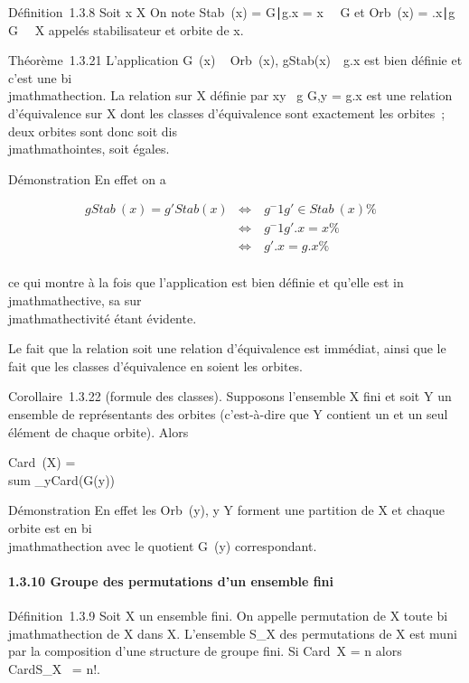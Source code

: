Définition~1.3.8 Soit x \in X On note Stab~(x) =
\g \in G∣g.x =
x\ \subset~ G et Orb~(x) =
\g.x∣g \in G\
\subset~ X appelés stabilisateur et orbite de x.

Théorème~1.3.21 L'application G\diagupStab~(x)
\rightarrow~ Orb~(x),
gStab(x)\mathrel\mapsto~~g.x est
bien définie et c'est une bi\\jmathmathection. La relation sur X définie par xy
\Leftrightarrow \exists~g \in G,y = g.x
est une relation d'équivalence sur X dont les classes d'équivalence sont
exactement les orbites~; deux orbites sont donc soit dis\\jmathmathointes, soit
égales.

Démonstration En effet on a

\begin{align*} gStab~(x) =
g'Stab(x)& \mathrel\Leftrightarrow~ &
g^-1g' \in Stab~(x)\%&
\\ & \Leftrightarrow &
g^-1g'.x = x \%& \\ &
\Leftrightarrow & g'.x = g.x \%&
\\ \end{align*}

ce qui montre à la fois que l'application est bien définie et qu'elle
est in\\jmathmathective, sa sur\\jmathmathectivité étant évidente.

Le fait que la relation soit une relation d'équivalence est immédiat,
ainsi que le fait que les classes d'équivalence en soient les orbites.

Corollaire~1.3.22 (formule des classes). Supposons l'ensemble X fini et
soit Y un ensemble de représentants des orbites (c'est-à-dire que Y
contient un et un seul élément de chaque orbite). Alors

Card~(X) = \\sum
_y\inY  Card(G\diagupStab(y))

Démonstration En effet les Orb~(y), y \in Y
forment une partition de X et chaque orbite est en bi\\jmathmathection avec le
quotient G\diagupStab~(y) correspondant.

\paragraph{1.3.10 Groupe des permutations d'un ensemble fini}

Définition~1.3.9 Soit X un ensemble fini. On appelle permutation de X
toute bi\\jmathmathection de X dans X. L'ensemble S_X des permutations de
X est muni par la composition d'une structure de groupe fini. Si
Card~X = n alors
CardS_X~ = n!.

